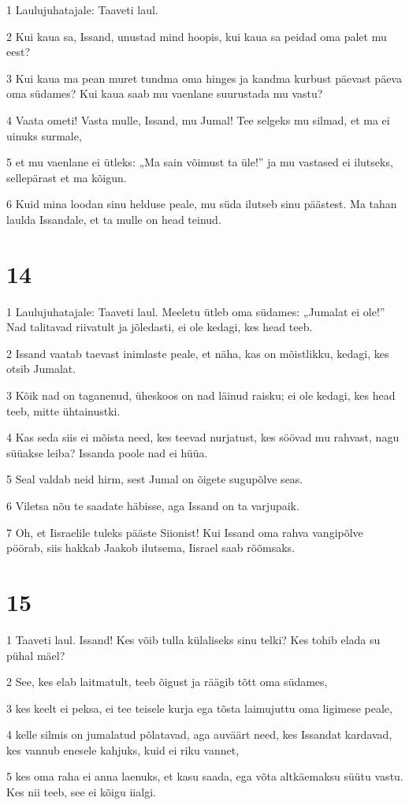 \par 1 Laulujuhatajale: Taaveti laul.
\par 2 Kui kaua sa, Issand, unustad mind hoopis, kui kaua sa peidad oma palet mu eest?
\par 3 Kui kaua ma pean muret tundma oma hinges ja kandma kurbust päevast päeva oma südames? Kui kaua saab mu vaenlane suurustada mu vastu?
\par 4 Vaata ometi! Vasta mulle, Issand, mu Jumal! Tee selgeks mu silmad, et ma ei uinuks surmale,
\par 5 et mu vaenlane ei ütleks: „Ma sain võimust ta üle!” ja mu vastased ei ilutseks, sellepärast et ma kõigun.
\par 6 Kuid mina loodan sinu helduse peale, mu süda ilutseb sinu päästest. Ma tahan laulda Issandale, et ta mulle on head teinud.

\chapter{14}

\par 1 Laulujuhatajale: Taaveti laul. Meeletu ütleb oma südames: „Jumalat ei ole!” Nad talitavad riivatult ja jõledasti, ei ole kedagi, kes head teeb.
\par 2 Issand vaatab taevast inimlaste peale, et näha, kas on mõistlikku, kedagi, kes otsib Jumalat.
\par 3 Kõik nad on taganenud, üheskoos on nad läinud raisku; ei ole kedagi, kes head teeb, mitte ühtainustki.
\par 4 Kas seda siis ei mõista need, kes teevad nurjatust, kes söövad mu rahvast, nagu süüakse leiba? Issanda poole nad ei hüüa.
\par 5 Seal valdab neid hirm, sest Jumal on õigete sugupõlve seas.
\par 6 Viletsa nõu te saadate häbisse, aga Issand on ta varjupaik.
\par 7 Oh, et Iisraelile tuleks pääste Siionist! Kui Issand oma rahva vangipõlve pöörab, siis hakkab Jaakob ilutsema, Iisrael saab rõõmsaks.

\chapter{15}

\par 1 Taaveti laul. Issand! Kes võib tulla külaliseks sinu telki? Kes tohib elada su pühal mäel?
\par 2 See, kes elab laitmatult, teeb õigust ja räägib tõtt oma südames,
\par 3 kes keelt ei peksa, ei tee teisele kurja ega tõsta laimujuttu oma ligimese peale,
\par 4 kelle silmis on jumalatud põlatavad, aga auväärt need, kes Issandat kardavad, kes vannub enesele kahjuks, kuid ei riku vannet,
\par 5 kes oma raha ei anna laenuks, et kasu saada, ega võta altkäemaksu süütu vastu. Kes nii teeb, see ei kõigu iialgi.

